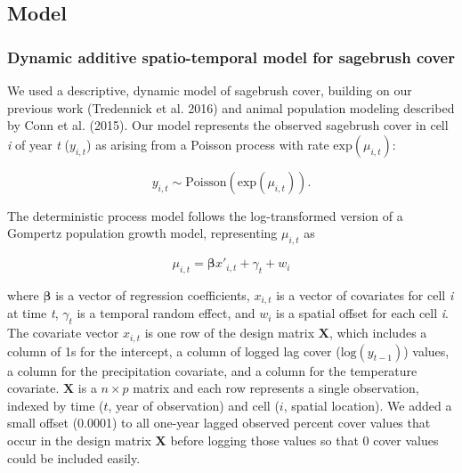 \documentclass[
  12pt,
]{article}
\begin{document}
\hypertarget{model}{%
\subsection{Model}\label{model}}

\hypertarget{dynamic-additive-spatio-temporal-model-for-sagebrush-cover}{%
\subsubsection{Dynamic additive spatio-temporal model for sagebrush cover}\label{dynamic-additive-spatio-temporal-model-for-sagebrush-cover}}

We used a descriptive, dynamic model of sagebrush cover, building on our previous work (Tredennick et al. 2016) and animal population modeling described by Conn et al. (2015).
Our model represents the observed sagebrush cover in cell \emph{i} of year \emph{t} (\(y_{i,t}\)) as arising from a Poisson process with rate \(\text{exp}(\mu_{i,t})\):

\begin{equation}
y_{i,t} \sim \text{Poisson}(\text{exp}(\mu_{i,t})).
\end{equation}

\noindent{}The deterministic process model follows the log-transformed version of a Gompertz population growth model, representing \(\mu_{i,t}\) as

\begin{equation}
\label{eq:regression}
\mu_{i,t} = \bm{\beta} x'_{i,t} + \gamma_{t} + w_{i}
\end{equation}

\noindent{}where \(\bm{\beta}\) is a vector of regression coefficients, \(x_{i,t}\) is a vector of covariates for cell \emph{i} at time \emph{t}, \(\gamma_{t}\) is a temporal random effect, and \(w_i\) is a spatial offset for each cell \emph{i}.
The covariate vector \(x_{i,t}\) is one row of the design matrix \(\textbf{X}\), which includes a column of 1s for the intercept, a column of logged lag cover (\(\text{log}(y_{t-1})\)) values, a column for the precipitation covariate, and a column for the temperature covariate.
\(\textbf{X}\) is a \(n \times p\) matrix and each row represents a single observation, indexed by time (\(t\), year of observation) and cell (\(i\), spatial location).
We added a small offset (0.0001) to all one-year lagged observed percent cover values that occur in the design matrix \(\textbf{X}\) before logging those values so that 0 cover values could be included easily.
\end{document}
